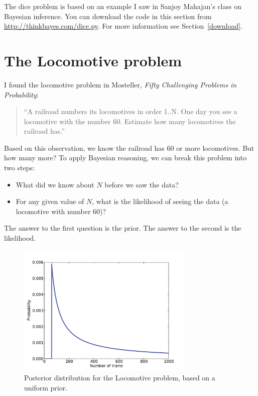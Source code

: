 \documentclass[12pt]{book}
\begin{document}
The dice problem is based on an example I saw in Sanjoy Mahajan's class on
Bayesian inference.  You can download the code in this section from
\url{http://thinkbayes.com/dice.py}.
  For more information
see Section~\ref{download}.

\section{The Locomotive problem}

I found the locomotive problem 
in Mosteller, {\it Fifty Challenging Problems in
  Probability}:

\begin{quote}
``A railroad numbers its locomotives in order 1..N.  One day you see a
locomotive with the number 60.  Estimate how many locomotives the
railroad has.''
\end{quote}

Based on this observation, we know the railroad has 60 or more
locomotives.  But how many more?  To apply Bayesian reasoning, we
can break this problem into two steps:

\begin{itemize}

\item What did we know about $N$ before we saw the data?

\item For any given value of $N$, what is the likelihood of
seeing the data (a locomotive with number 60)?

\end{itemize}

The answer to the first question is the prior.  The answer to the
second is the likelihood.

\begin{figure}
\centerline{\includegraphics[height=2.5in]{figs/train1.pdf}}
\caption{Posterior distribution for the Locomotive problem, based
on a uniform prior.}
\label{fig.train1}
\end{figure}
\end{document}
